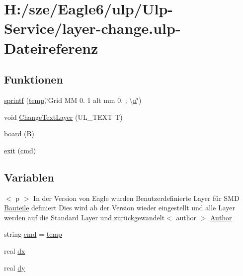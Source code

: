 \hypertarget{layer-change_8ulp}{}\section{H\+:/sze/\+Eagle6/ulp/\+Ulp-\/\+Service/layer-\/change.ulp-\/\+Dateireferenz}
\label{layer-change_8ulp}
\subsection*{Funktionen}
\begin{DoxyCompactItemize}
\item 
\hyperlink{layer-change_8ulp_a7505e749f23041ae4cf0115c6f33f4da}{sprintf} (\hyperlink{text_8ulp_a57c52213e1c32a667a5963a122e0a23b}{temp},\char`\"{}Grid M\+M 0. 1 alt mm 0. ; \textbackslash{}\hyperlink{read_database_8ulp_a76f11d9a0a47b94f72c2d0e77fb32240}{n}\char`\"{})
\item 
void \hyperlink{layer-change_8ulp_a5c49580ff8392d09d647b4c71798660c}{Change\+Text\+Layer} (U\+L\+\_\+\+T\+E\+X\+T T)
\item 
\hyperlink{layer-change_8ulp_a3139e18cbc64a26859cbd2749be11ced}{board} (B)
\item 
\hyperlink{layer-change_8ulp_a2714d6612a72dbc557ace02c68470562}{exit} (\hyperlink{text_8ulp_a90e155eddac72ef87020b85a704d97be}{cmd})
\end{DoxyCompactItemize}
\subsection*{Variablen}
\begin{DoxyCompactItemize}
\item 
$<$ p $>$ In der Version von Eagle wurden Benutzerdefinierte Layer für S\+M\+D \hyperlink{suche_8ulp_a093b50ecdc1cc55a1997cfbb25356737}{Bauteile} definiert Dies wird ab der Version wieder eingestellt und alle Layer werden auf die Standard Layer und zurückgewandelt$<$ author $>$ \hyperlink{layer-change_8ulp_a17068cf58becd4355cc671821ba9d27c}{Author}
\item 
string \hyperlink{layer-change_8ulp_adfc5ba7e22f5e4a6221c12a70503bef3}{cmd} = \hyperlink{text_8ulp_a57c52213e1c32a667a5963a122e0a23b}{temp}
\item 
real \hyperlink{layer-change_8ulp_a977a1936eb0c42c0dc8befdd36c402db}{dx}
\item 
real \hyperlink{layer-change_8ulp_a5e9a2bb87d9944b591c7b364e25eabb6}{dy}
\end{DoxyCompactItemize}


